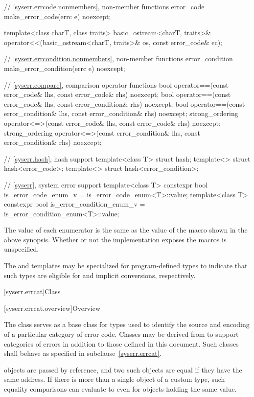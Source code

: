 \begin{codeblock}
{  // \ref{syserr.errcode.nonmembers}, non-member functions
  error_code make_error_code(errc e) noexcept;

  template<class charT, class traits>
    basic_ostream<charT, traits>&
      operator<<(basic_ostream<charT, traits>& os, const error_code& ec);

  // \ref{syserr.errcondition.nonmembers}, non-member functions
  error_condition make_error_condition(errc e) noexcept;

  // \ref{syserr.compare}, comparison operator functions
  bool operator==(const error_code& lhs, const error_code& rhs) noexcept;
  bool operator==(const error_code& lhs, const error_condition& rhs) noexcept;
  bool operator==(const error_condition& lhs, const error_condition& rhs) noexcept;
  strong_ordering operator<=>(const error_code& lhs, const error_code& rhs) noexcept;
  strong_ordering operator<=>(const error_condition& lhs, const error_condition& rhs) noexcept;

  // \ref{syserr.hash}, hash support
  template<class T> struct hash;
  template<> struct hash<error_code>;
  template<> struct hash<error_condition>;

  // \ref{syserr}, system error support
  template<class T>
    constexpr bool is_error_code_enum_v = is_error_code_enum<T>::value;
  template<class T>
    constexpr bool is_error_condition_enum_v = is_error_condition_enum<T>::value;
}
\end{codeblock}

\pnum
The value of each  enumerator is the same as
the value of the  macro shown in the above synopsis.
Whether or not the  implementation
exposes the  macros is unspecified.

\pnum
The  and  templates may be
specialized for program-defined types to indicate that such types are eligible
for  and  implicit
conversions, respectively.

[syserr.errcat]{Class }

[syserr.errcat.overview]{Overview}

\pnum
The class  serves as a base class for types used
to identify the source and encoding of a particular category of error code.
Classes may be derived from  to support
categories of errors in addition to those defined in this document.
Such classes shall behave as specified in subclause~\ref{syserr.errcat}.
\begin{note}
 objects are
passed by reference, and two such objects
are equal if they have the same address.
If there is more than a single object of a custom  type,
such equality comparisons can evaluate to 
even for objects holding the same value.
\end{note}

